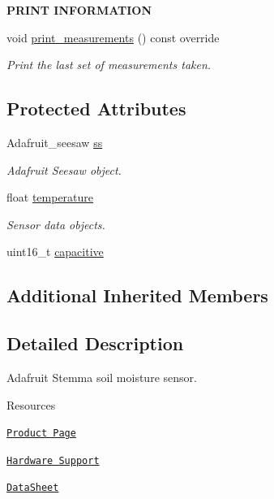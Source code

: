 \begin{Indent}{\bf P\+R\+I\+NT I\+N\+F\+O\+R\+M\+A\+T\+I\+ON}\par
\begin{DoxyCompactItemize}
\item 
void \hyperlink{class_loom___s_t_e_m_m_a_aa7f730c402dfecd8e0401e569ecfe5c3}{print\+\_\+measurements} () const override
\begin{DoxyCompactList}\small\item\em Print the last set of measurements taken. \end{DoxyCompactList}\end{DoxyCompactItemize}
\end{Indent}
\subsection*{Protected Attributes}
\begin{DoxyCompactItemize}
\item 
Adafruit\+\_\+seesaw \hyperlink{class_loom___s_t_e_m_m_a_afaef66b72da7983be590ca9fd8e8a43b}{ss}
\begin{DoxyCompactList}\small\item\em Adafruit Seesaw object. \end{DoxyCompactList}\item 
float \hyperlink{class_loom___s_t_e_m_m_a_a71c6cb89007396bb88f265ad70b998b0}{temperature}
\begin{DoxyCompactList}\small\item\em Sensor data objects. \end{DoxyCompactList}\item 
uint16\+\_\+t \hyperlink{class_loom___s_t_e_m_m_a_a9bc07affd7f811ccd9ec562d78e24ee6}{capacitive}
\end{DoxyCompactItemize}
\subsection*{Additional Inherited Members}


\subsection{Detailed Description}
Adafruit Stemma soil moisture sensor. 

\begin{DoxyParagraph}{Resources}

\begin{DoxyItemize}
\item \href{https://learn.adafruit.com/adafruit-stemma-soil-sensor-i2c-capacitive-moisture-sensor/arduino-test}{\tt Product Page}
\item \href{https://github.com/OPEnSLab-OSU/Loom/wiki/Hardware-Support#stemma-soil-sensor}{\tt Hardware Support}
\item \href{https://cdn-learn.adafruit.com/downloads/pdf/adafruit-stemma-soil-sensor-i2c-capacitive-moisture-sensor.pdf?timestamp=1594765200}{\tt Data\+Sheet} 
\end{DoxyItemize}
\end{DoxyParagraph}


